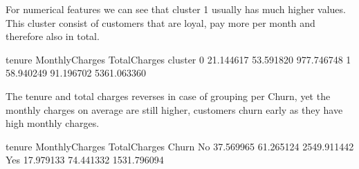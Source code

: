 \documentclass[letterpaper,10pt,english]{jupyterBook}
\begin{document}
\sphinxAtStartPar
For numerical features we can see that cluster 1 usually has much higher values. This cluster consist of customers that are loyal, pay more per month and therefore also in total.

\begin{sphinxVerbatim}[commandchars=\\\{\}]
\PYG{p}{[}\PYG{p}{[}  \PYG{p}{]}\PYG{p}{]}
\end{sphinxVerbatim}

\begin{sphinxVerbatim}[commandchars=\\\{\}]
            tenure  MonthlyCharges  TotalCharges
cluster                                         
0        21.144617       53.591820    977.746748
1        58.940249       91.196702   5361.063360
\end{sphinxVerbatim}

\sphinxAtStartPar
The tenure and total charges reverses in case of grouping per Churn, yet the monthly charges on average are still higher, customers churn early as they have high monthly charges.

\begin{sphinxVerbatim}[commandchars=\\\{\}]
\PYG{p}{[}\PYG{p}{[}  \PYG{p}{]}\PYG{p}{]}
\end{sphinxVerbatim}

\begin{sphinxVerbatim}[commandchars=\\\{\}]
          tenure  MonthlyCharges  TotalCharges
Churn                                         
No     37.569965       61.265124   2549.911442
Yes    17.979133       74.441332   1531.796094
\end{sphinxVerbatim}
\end{document}
